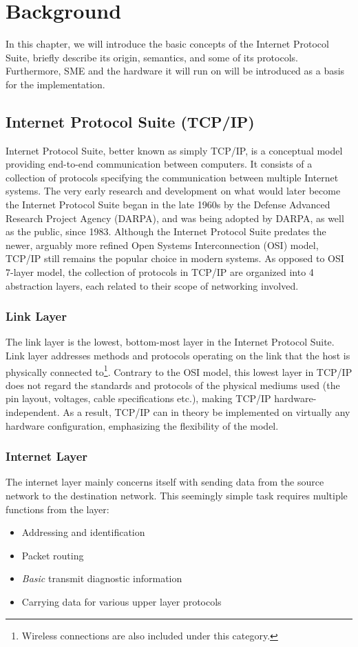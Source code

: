 \chapter{Background}


In this chapter, we will introduce the basic concepts of the Internet Protocol
Suite, briefly describe its origin, semantics, and some of its protocols.
Furthermore, SME and the hardware it will run on will be introduced as a basis 
for the implementation.


\section{Internet Protocol Suite (TCP/IP)}
Internet Protocol Suite, better known as simply TCP/IP, is a conceptual
model providing end-to-end communication between computers. It consists of
a collection of protocols specifying the communication between multiple
Internet systems\cite{RFC1122}.  The very early research and development
on what would later become the Internet Protocol Suite began in the late 1960s
by the Defense Advanced Research Project Agency (DARPA), and was being
adopted by DARPA, as well as the public, since 1983\cite{DARPA_internet}.
Although the Internet Protocol Suite predates the newer, arguably more
refined Open Systems Interconnection (OSI) model, TCP/IP still
remains the popular choice in modern systems.  As opposed to OSI 7-layer
model\cite{X.200}, the collection of protocols in TCP/IP are organized
into 4 abstraction layers, each related to their scope of networking
involved.

\subsection{Link Layer}
The link layer is the lowest, bottom-most layer in the Internet Protocol Suite.
Link layer addresses methods and protocols operating on the link that the host
is physically connected to\footnote{Wireless connections are also included
under this category.}. Contrary to the OSI model, this lowest layer in TCP/IP
does not regard the standards and protocols of the physical mediums used (the
pin layout, voltages, cable specifications etc.), making TCP/IP hardware-independent.
As a result, TCP/IP can in theory be implemented on virtually any hardware
configuration, emphasizing the flexibility of the model.

\subsection{Internet Layer}
The internet layer mainly concerns itself with sending data from the source
network to the destination network. This seemingly simple task requires multiple
functions from the layer:
\begin{itemize}
    \item Addressing and identification
    \item Packet routing
    \item \emph{Basic} transmit diagnostic information
    \item Carrying data for various upper layer protocols
\end{itemize}


